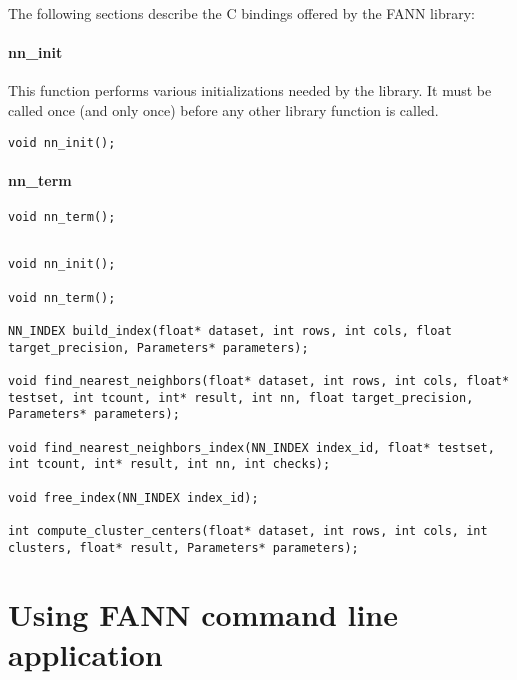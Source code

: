 \documentclass[letter,10pt]{article}
\begin{document}
The following sections describe the C bindings offered by the FANN library:

\paragraph{nn\_init}
This function performs various initializations needed by the library. It must be called once (and only once) before any other library function is called.
\begin{Verbatim}[fontsize=\footnotesize]
void nn_init();
\end{Verbatim}


\paragraph{nn\_term}
\begin{Verbatim}[fontsize=\footnotesize]
void nn_term();
\end{Verbatim}



\begin{Verbatim}[fontsize=\footnotesize]

void nn_init();

void nn_term();

NN_INDEX build_index(float* dataset, int rows, int cols, float target_precision, Parameters* parameters);

void find_nearest_neighbors(float* dataset, int rows, int cols, float* testset, int tcount, int* result, int nn, float target_precision, Parameters* parameters);

void find_nearest_neighbors_index(NN_INDEX index_id, float* testset, int tcount, int* result, int nn, int checks);

void free_index(NN_INDEX index_id);

int compute_cluster_centers(float* dataset, int rows, int cols, int clusters, float* result, Parameters* parameters);
\end{Verbatim}



\section{Using FANN command line application}
\end{document}
